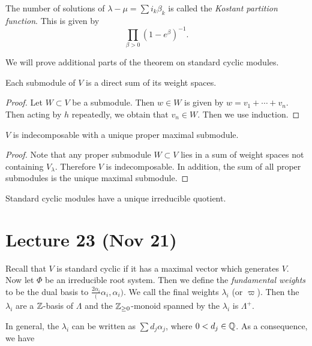 \documentclass[twoside, 10pt]{article}
\begin{document}
    \begin{rmk}
        The number of solutions of $\lambda - \mu = \sum i_k \beta_k$ is called the \textit{Kostant partition function}. This is given by 
        \[ \prod_{\beta > 0} (1-e^{\beta})^{-1}.\]
    \end{rmk}

    We will prove additional parts of the theorem on standard cyclic modules.
    \begin{prop}
        Each submodule of $V$ is a direct sum of its weight spaces.
    \end{prop}

    \begin{proof}
        Let $W \subset V$ be a submodule. Then $w \in W$ is given by $w = v_1 + \cdots + v_n$. Then acting by $h$ repeatedly, we obtain that $v_n \in W$. Then we use induction.
    \end{proof}

    \begin{prop}
        $V$ is indecomposable with a unique proper maximal submodule.
    \end{prop}

    \begin{proof}
        Note that any proper submodule $W \subset V$ lies in a sum of weight spaces not containing $V_{\lambda}$. Therefore $V$ is indecomposable. In addition, the sum of all proper submodules is the unique maximal submodule.
    \end{proof}

    \begin{cor}
        Standard cyclic modules have a unique irreducible quotient.
    \end{cor}

    \section{Lecture 23 (Nov 21)}%
    \label{sec:lecture_23_nov_21_}
    
    Recall that $V$ is standard cyclic if it has a maximal vector which generates $V$. Now let $\Phi$ be an irreducible root system. Then we define the \textit{fundamental weights} to be the dual basis to $\frac{2\alpha_i}(\alpha_i, \alpha_i)$. We call the final weights $\lambda_i$ (or $\varpi$). Then the $\lambda_i$ are a $\mathbb{Z}$-basis of $\Lambda$ and the $\mathbb{Z}_{\geq 0}$-monoid spanned by the $\lambda_i$ is $\Lambda^+$.

    In general, the $\lambda_i$ can be written as $\sum d_j\alpha_j$, where $0 < d_j \in \mathbb{Q}$. As a consequence, we have
\end{document}
